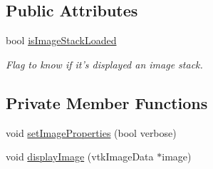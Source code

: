 \subsection*{Public Attributes}
\begin{DoxyCompactItemize}
\item 
bool \hyperlink{class_q_v_t_k_image_widget_ac1af73fa525569f5ec5d581561b379a3}{is\-Image\-Stack\-Loaded}
\begin{DoxyCompactList}\small\item\em Flag to know if it's displayed an image stack. \end{DoxyCompactList}\end{DoxyCompactItemize}
\subsection*{Private Member Functions}
\begin{DoxyCompactItemize}
\item 
void \hyperlink{class_q_v_t_k_image_widget_a148e0e9402c79f81afd1079754aec7d2}{set\-Image\-Properties} (bool verbose)
\item 
void \hyperlink{class_q_v_t_k_image_widget_a48d0dad3ffc56126e2f3cbf14ee0fe98}{display\-Image} (vtk\-Image\-Data $\ast$image)
\end{DoxyCompactItemize}
